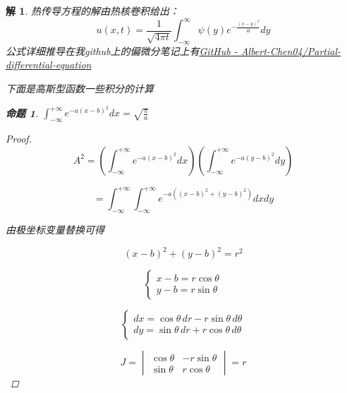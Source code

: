 \documentclass[12pt,a4paper]{article}
\newtheorem*{solution}{解}
\newtheorem{example}{命题}
\begin{document}
\begin{solution}

	热传导方程的解由热核卷积给出：
	\[
	u(x,t) = \frac{1}{\sqrt{4\pi t}} \int_{-\infty}^\infty \psi(y) e^{-\frac{(x-y)^2}{4t}} dy
	\]
	公式详细推导在我github上的偏微分笔记上有\href{https://github.com/Albert-Chen04/Partial-differential-equation}{GitHub - Albert-Chen04/Partial-differential-equation}
	
	下面是高斯型函数一些积分的计算
	
	
	
	\begin{example}
		\label{ex:1}
	$	\int_{-\infty}^{+\infty} e^{-a(x-b)^2} dx = \sqrt{\frac{\pi}{a}}$
	\end{example}
	
	
	\begin{proof}
		\begin{equation*}
		A^2 = \left( \int_{-\infty}^{+\infty} e^{-a(x-b)^2} dx \right) \left( \int_{-\infty}^{+\infty} e^{-a(y-b)^2} dy \right)
	\end{equation*}
	
	\begin{equation*}
		= \int_{-\infty}^{+\infty} \int_{-\infty}^{+\infty} e^{-a((x-b)^2 + (y-b)^2)} dx dy
	\end{equation*}
	
	由极坐标变量替换可得
	
	\begin{equation*}
		(x - b)^2 + (y - b)^2 = r^2
	\end{equation*}
	
	\begin{equation*}
		\begin{cases}
			x - b = r \cos\theta \\
			y - b = r \sin\theta
		\end{cases}
	\end{equation*}
	
	\begin{equation*}
		\begin{cases}
			dx = \cos\theta \, dr - r \sin\theta \, d\theta \\
			dy = \sin\theta \, dr + r \cos\theta \, d\theta
		\end{cases}
	\end{equation*}
	
	\begin{equation*}
		J = \begin{vmatrix}
			\cos\theta & -r \sin\theta \\
			\sin\theta & r \cos\theta
		\end{vmatrix} = r
	\end{equation*}
	

\end{proof}
\end{solution}
\end{document}
